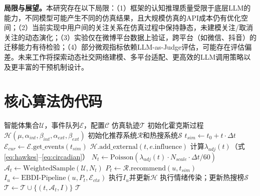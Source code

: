 \documentclass[lettersize,journal]{IEEEtran}
\begin{document}
\textbf{局限与展望。}本研究存在以下局限：（1）框架的认知推理质量受限于底层LLM的能力，不同模型可能产生不同的仿真结果，且大规模仿真的API成本仍有优化空间；（2）当前实现中用户间的关注关系在仿真过程中保持静态，未建模关注/取消关注的动态演化；（3）实验仅在微博平台数据上验证，跨平台（如微信、抖音）的迁移能力有待检验；（4）部分微观指标依赖LLM-as-Judge评估，可能存在评估偏差。未来工作将探索动态社交网络建模、多平台适配、更高效的LLM调用策略以及更丰富的干预机制设计。







\appendices

\section{核心算法伪代码}

\begin{algorithm}[!t]
\caption{POSIM仿真主循环}
\label{alg:main}
\begin{algorithmic}[1]
\REQUIRE 智能体集合$\mathcal{U}$，事件队列$\mathcal{E}$，配置$\mathcal{C}$
\ENSURE 仿真轨迹$\mathcal{T}$
\STATE 初始化霍克斯过程$\mathcal{H}(\mu, \alpha_{int}, \beta_{int}, \alpha_{ext}, \beta_{ext})$
\STATE 初始化推荐系统$\mathcal{R}$和热搜系统$\mathcal{S}$
 \STATE $t_{sim} \leftarrow t_0 + t \cdot \Delta t$
 \STATE $\mathcal{E}_{cur} \leftarrow \mathcal{E}.\text{get\_events}(t_{sim})$
 \STATE $\mathcal{H}.\text{add\_external}(t, e.\text{influence})$
 \ENDFOR
 \STATE 计算$\lambda_{adj}(t)$（式\ref{eq:hawkes}--\ref{eq:circadian}）
 \STATE $N_t \leftarrow \text{Poisson}(\lambda_{adj}(t) \cdot N_{scale} \cdot \Delta t / 60)$
 \STATE $\mathcal{A}_t \leftarrow \text{WeightedSample}(\mathcal{U}, N_t)$
 \STATE $P_t \leftarrow \mathcal{R}.\text{recommend}(u, t_{sim})$
 \STATE $I_u \leftarrow \text{EBDI-Pipeline}(u, P_t, \mathcal{E}_{ctx})$ 
 \STATE 执行$I_u$并更新$\mathcal{H}$
 \ENDFOR
 \STATE 执行情绪传染；更新热搜榜$\mathcal{S}$
 \STATE $\mathcal{T} \leftarrow \mathcal{T} \cup \{(t, \mathcal{A}_t, I)\}$
\ENDFOR
\RETURN $\mathcal{T}$
\end{algorithmic}
\end{algorithm}
\end{document}
